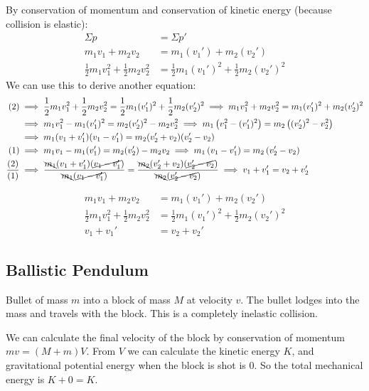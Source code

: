 \documentclass{article}
\newcommand{\theorem}[2]{\begin{tcolorbox}[title={#1},colback=blue!5!white,colframe=blue!75!black,parbox=false] #2 \end{tcolorbox}}
\begin{document}
By conservation of momentum and conservation of kinetic energy (because collision is elastic):
\begin{align*}
	\Sigma p&=\Sigma p' \\
	m_1v_1+m_2v_2&=m_1(v_1')+m_2(v_2') \tag{1} \\
	\frac12m_1v_1^2+\frac12m_2v_2^2&=\frac12m_1(v_1')^2+\frac12m_2(v_2')^2 \tag{2}
\end{align*}
We can use this to derive another equation:
\begin{align*}
	(2)
	&\implies \frac12m_1v_1^2+\frac12m_2v_2^2=\frac12m_1(v_1')^2+\frac12m_2(v_2')^2
	\implies m_1v_1^2+m_2v_2^2=m_1(v_1')^2+m_2(v_2')^2 \\
	&\implies m_1 v_1^2-m_1(v_1')^2=m_2(v_2')^2-m_2v_2^2
	\implies m_1 \left( v_1^2-(v_1')^2 \right)=m_2 \left( (v_2')^2-v_2^2 \right) \\
	&\implies m_1(v_1+v_1')(v_1-v_1')=m_2(v_2'+v_2)(v_2'-v_2) \\
	(1)
	&\implies m_1v_1-m_1(v_1')=m_2(v_2')-m_2v_2
	\implies m_1 \left( v_1-v_1' \right)=m_2 \left( v_2'-v_2 \right) \\
	\frac{(2)}{(1)}
	&\implies \frac{\bcancel{m_1}(v_1+v_1')(\cancel{v_1-v_1'})}{\bcancel{m_1}(\cancel{v_1-v_1'})}=\frac{\bcancel{m_2}(v_2'+v_2)(\cancel{v_2'-v_2})}{\bcancel{m_2}(\cancel{v_2'-v_2})}
	\implies v_1+v_1'=v_2+v_2'
\end{align*}

\theorem{Equations for a head-on elastic collision}{
	\begin{align*}
		m_1v_1+m_2v_2&=m_1(v_1')+m_2(v_2') \tag{Conservation of Momentum} \\
		\frac12m_1v_1^2+\frac12m_2v_2^2&=\frac12m_1(v_1')^2+\frac12m_2(v_2')^2 \tag{Conservation of Kinetic Energy} \\
		v_1+v_1'&=v_2+v_2'
	\end{align*}
}

\subsection{Ballistic Pendulum}

Bullet of mass $m$ into a block of mass $M$ at velocity $v$. The bullet lodges into the mass and travels with the block. This is a completely inelastic collision.

We can calculate the final velocity of the block by conservation of momentum $mv=(M+m)V$. From $V$ we can calculate the kinetic energy $K$, and gravitational potential energy when the block is shot is $0$. So the total mechanical energy is $K+0=K$.
\end{document}
